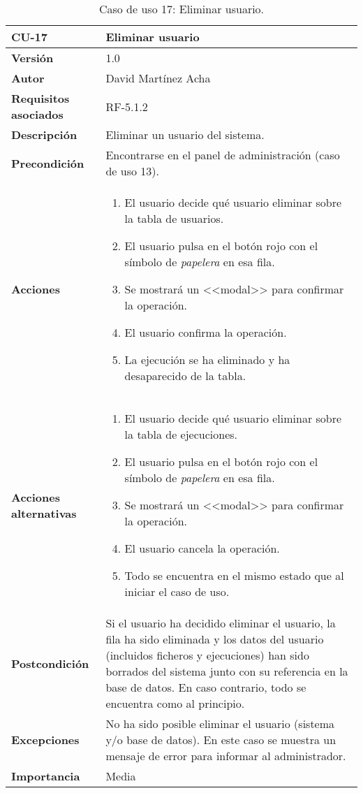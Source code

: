 \begin{table}[p]
	\centering
	\begin{tabularx}{\linewidth}{ p{} p{} }
		\toprule
		\textbf{CU-17}    & \textbf{Eliminar usuario}\\
		\toprule
		\textbf{Versión}              & 1.0    \\
		\textbf{Autor}                & David Martínez Acha \\
		\textbf{Requisitos asociados} & RF-5.1.2 \\
		\textbf{Descripción}          & Eliminar un usuario del sistema. \\
		\textbf{Precondición}         & Encontrarse en el panel de administración (caso de uso 13). \\
		\textbf{Acciones}             &
		\begin{enumerate}
			\def\labelenumi{\arabic{enumi}.}
			\tightlist
			\item El usuario decide qué usuario eliminar sobre la tabla de usuarios.
			\item El usuario pulsa en el botón rojo con el símbolo de \textit{papelera} en esa fila.
			\item Se mostrará un <<modal>> para confirmar la operación.
			\item El usuario confirma la operación.
			\item La ejecución se ha eliminado y ha desaparecido de la tabla.
		\end{enumerate}\\
		\textbf{Acciones alternativas}&
		\begin{enumerate}
			\def\labelenumi{\arabic{enumi}.}
			\tightlist
			\item El usuario decide qué usuario eliminar sobre la tabla de ejecuciones.
			\item El usuario pulsa en el botón rojo con el símbolo de \textit{papelera} en esa fila.
			\item Se mostrará un <<modal>> para confirmar la operación.
			\item El usuario cancela la operación.
			\item Todo se encuentra en el mismo estado que al iniciar el caso de uso.
		\end{enumerate}\\
		\textbf{Postcondición}        & Si el usuario ha decidido eliminar el usuario, la fila ha sido eliminada y los datos del usuario (incluidos ficheros y ejecuciones) han sido borrados del sistema junto con su referencia en la base de datos. 
		En caso contrario, todo se encuentra como al principio.\\
		\textbf{Excepciones}          & No ha sido posible eliminar el usuario (sistema y/o base de datos). En este caso se muestra un mensaje de error para informar al administrador. \\
		\textbf{Importancia}          & Media \\
		\bottomrule
	\end{tabularx}
	\caption{Caso de uso 17: Eliminar usuario.}
\end{table}


